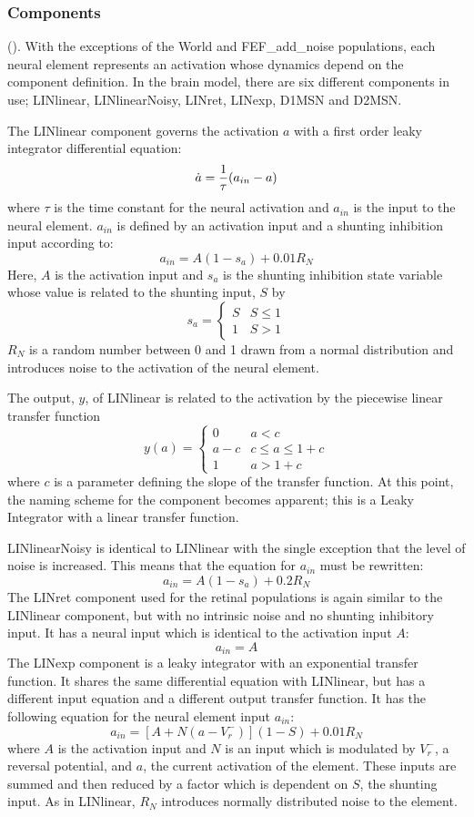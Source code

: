 \documentclass{frontiersSCNS}
\begin{document}
\subsubsection{Components}

(). With the exceptions of the World and
FEF\_add\_noise populations, each neural element represents an
activation whose dynamics depend on the component definition. In the
brain model, there are six different components in use; LINlinear,
LINlinearNoisy, LINret, LINexp, D1MSN and D2MSN.

The LINlinear component governs the activation $a$ with a first order
leaky integrator differential equation:
\[
   \dot{a} = {1 \over \tau}(a_{in}-a)
\]
where $\tau$ is the time constant for the neural activation and
$a_{in}$ is the input to the neural element. $a_{in}$ is defined by an
activation input and a shunting inhibition input according to:
\[
   a_{in} = A(1-s_a)+0.01 R_N
\]
Here, $A$ is the activation input and $s_a$ is the shunting inhibition
state variable whose value is related to the shunting input, $S$ by
\[
   s_a = \begin{cases}
      S & S\leq 1 \\
      1 & S > 1
   \end{cases}
\]
$R_N$ is a random number between 0 and 1 drawn from a
normal distribution and introduces noise to the activation of the
neural element.

The output, $y$, of LINlinear is related to the activation by the
piecewise linear transfer function
\[
   y(a) = \begin{cases}
      0   & a < c \\
      a-c & c \leq a \leq 1+c \\
      1   & a > 1+c
   \end{cases}
\]
where $c$ is a parameter defining the slope of the transfer
function. At this point, the naming scheme for the component becomes
apparent; this is a Leaky Integrator with a linear transfer function.

LINlinearNoisy is identical to LINlinear with the single exception
that the level of noise is increased. This means that the equation for
$a_{in}$ must be rewritten:
\[
   a_{in} = A(1-s_a)+0.2 R_N
\]
The LINret component used for the retinal populations is again similar
to the LINlinear component, but with no intrinsic noise and no
shunting inhibitory input. It has a neural input which is identical to
the activation input $A$:
\[
   a_{in} = A
\]
The LINexp component is a leaky integrator with an exponential
transfer function. It shares the same differential equation with
LINlinear, but has a different input equation and a different output
transfer function. It has the following equation for the neural
element input $a_{in}$:
\[
   a_{in} = [A+N(a-V_{r}^{-})] (1-S) + 0.01 R_N
\]
where $A$ is the activation input and $N$ is an input which is
modulated by $V_{r}^{-}$, a reversal potential, and $a$, the current
activation of the element. These inputs are summed and then reduced by
a factor which is dependent on $S$, the shunting input. As in
LINlinear, $R_N$ introduces normally distributed noise to the element.
\end{document}
